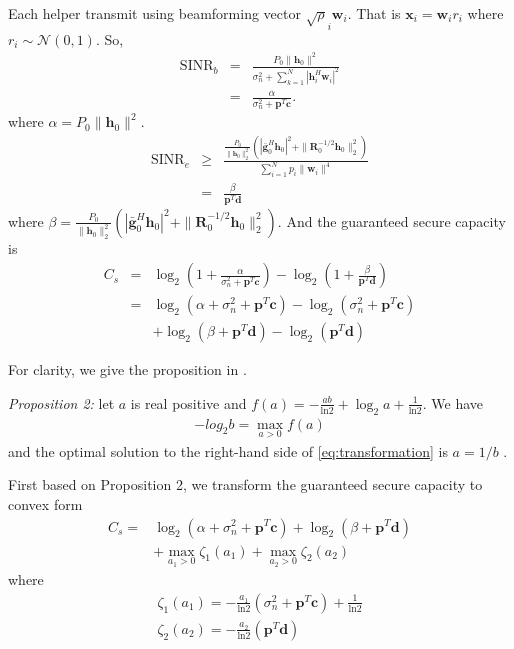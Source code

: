 \documentclass[conference]{IEEEtran}
\begin{document}
Each helper transmit using beamforming vector $\sqrt{\rho}_i\mathbf{w}_i$. That is $\mathbf{x}_i = \mathbf{w}_ir_i$ where $r_i \sim \mathcal{N}(0,1)$. So, 
\begin{eqnarray}
\mathrm{SINR}_b &=& \frac{P_0\|\mathbf{h}_{0}\|^2}{\sigma_n^2 + \sum_{k=1}^{N}|\mathbf{h}_{i}^H\mathbf{w}_{i}|^2} \\ 
&=&\frac{\alpha}{\sigma_n^2 + \mathbf{p}^T\mathbf{c}}.
\end{eqnarray}
where $\alpha = P_0\|\mathbf{h}_{0}\|^2$.
\begin{eqnarray}
	\mathrm{SINR}_e& \geq & \frac{\frac{P_0}{\|\mathbf{h}_0\|_2^2}(|\bar{\mathbf{g}}_0^H\mathbf{h}_0|^2 + \|\mathbf{R}_0^{-1/2}\mathbf{h}_0\|_2^2)}{\sum_{i = 1}^{N}p_i\|\mathbf{w}_i\|^4}\\
	&=&\frac{\beta}{\mathbf{p}^T\mathbf{d}}
\end{eqnarray}
where $\beta = \frac{P_0}{\|\mathbf{h}_0\|_2^2}(|\bar{\mathbf{g}}_0^H\mathbf{h}_0|^2 + \|\mathbf{R}_0^{-1/2}\mathbf{h}_0\|_2^2)$.  And the guaranteed secure capacity is
\begin{eqnarray}
C_s &=& \log_2(1 + \frac{\alpha}{\sigma_n^2 + \mathbf{p}^T\mathbf{c}}) - \log_2(1 + \frac{\beta}{\mathbf{p}^T\mathbf{d}})\\
&=&\log_2(\alpha + \sigma_n^2 + \mathbf{p}^T\mathbf{c})-\log_2(\sigma_n^2 + \mathbf{p}^T\mathbf{c}) \nonumber\\
&&+ \log_2(\beta+\mathbf{p}^T\mathbf{d}) - \log_2(\mathbf{p}^T\mathbf{d})
\end{eqnarray}

For clarity, we give the proposition in \cite{7015632}.

\emph{Proposition 2:} let $a$ is real positive and $ f(a) = -\frac{ab}{\mathrm{ln}2} + \log_2a +\frac{1}{\mathrm{ln}2}$. We have 
\begin{eqnarray}
	-log_2b = \max_{a>0}f(a) \label{eq:transformation}
\end{eqnarray}
and the optimal solution to the right-hand side of \eqref{eq:transformation} is  $a = 1/b$ \cite{7015632}.

First based on Proposition 2, we transform the guaranteed secure capacity to convex form
\begin{eqnarray}
C_s = &\log_2(\alpha + \sigma_n^2 +  \mathbf{p}^T\mathbf{c})  + \log_2(\beta+\mathbf{p}^T\mathbf{d}) \nonumber\\
&+ \max_{a_1 > 0}\zeta_1(a_1) +\max_{a_2>0}\zeta_2(a_2) 
\end{eqnarray}
where 
\begin{eqnarray}
\zeta_1(a_1) = -\frac{a_1}{\mathrm{ln}2}\left( \sigma_n^2 + \mathbf{p}^T\mathbf{c}\right) + \frac{1}{\mathrm{ln}2}\\
\zeta_2(a_2) = -\frac{a_2}{\mathrm{ln}2}\left( \mathbf{p}^T\mathbf{d}\right)
\end{eqnarray}
\end{document}
